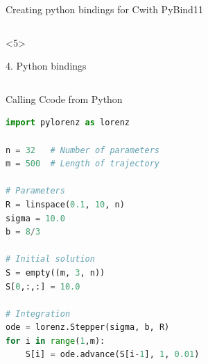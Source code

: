 \documentclass[@BEAMER_OPTIONS@]{beamer}
\newcommand{\CXX}{{\rm C}\plusplus}
\begin{document}
\begin{frame}[fragile]{Creating python bindings for \CXX with PyBind11}
\begin{columns}
\begin{column}[c]{0.7\textwidth}
            \begin{onlyenv}<5>
                \begin{exampleblock}{4. Python bindings}
                    \begin{adjustbox}{width=0.6\textwidth, height=\textheight, keepaspectratio}
                        \begin{minipage}{\textwidth}
                            
                        \end{minipage}
                    \end{adjustbox}
                \end{exampleblock}
            \end{onlyenv}
        \end{column}
    \end{columns}
\end{frame}

\begin{frame}[fragile]{Calling \CXX code from Python}
    \begin{exampleblock}{}
        \begin{lstlisting}[language=python]
import pylorenz as lorenz

n = 32   # Number of parameters
m = 500  # Length of trajectory

# Parameters
R = linspace(0.1, 10, n)
sigma = 10.0
b = 8/3

# Initial solution
S = empty((m, 3, n))
S[0,:,:] = 10.0

# Integration
ode = lorenz.Stepper(sigma, b, R)
for i in range(1,m):
    S[i] = ode.advance(S[i-1], 1, 0.01)
        \end{lstlisting}
    \end{exampleblock}
\end{frame}
\end{document}
